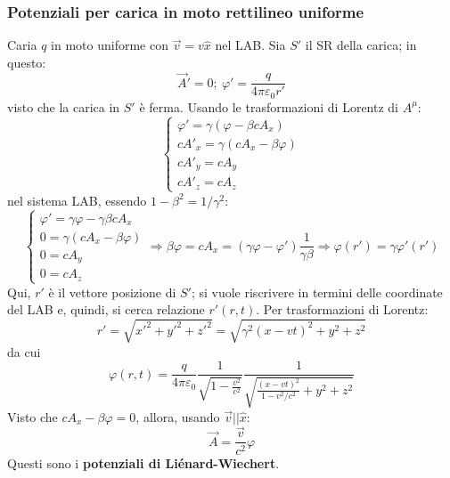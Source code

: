 \documentclass[a4paper]{scrartcl}
\numberwithin{equation}{subsection}
\theoremstyle{style1}
\begin{document}
\subsubsection{Potenziali per carica in moto rettilineo uniforme}\label{pcmru}

Caria $q$ in moto uniforme con $\vec{v}=v \hat{x}$ nel LAB. Sia $S'$ il SR della carica; in questo:
\begin{equation}
		\vec{A}' = 0; \ \varphi ' = \frac{q}{4 \pi \varepsilon _0 r'} 
\end{equation}
visto che la carica in $S'$ \`e ferma. Usando le trasformazioni di Lorentz di $A^\mu $:
\begin{equation}
	\begin{cases}
		\varphi ' = \gamma(\varphi  - \beta cA_x)\\
		cA'_x = \gamma(cA_x - \beta \varphi ) \\
		cA'_y = cA_y \\
		cA'_z = cA_z
	\end{cases}
\end{equation}
nel sistema LAB, essendo $1-\beta ^2 = 1 / \gamma^2$:
\begin{equation}
	\begin{cases}
	\varphi ' = \gamma\varphi  - \gamma \beta c A_x \\
	0 = \gamma(cA_x - \beta \varphi )\\
	0 = cA_y \\
	0 = cA_z
\end{cases} \Rightarrow \beta \varphi = cA_x = (\gamma\varphi  - \varphi ') \frac{1}{\gamma\beta }\Rightarrow \varphi(r')  = \gamma\varphi '(r')
\end{equation}
Qui, $r'$ \`e il vettore posizione di $S'$; si vuole riscrivere in termini delle coordinate del LAB e, quindi, si cerca relazione $r'(r,t)$. Per trasformazioni di Lorentz:
\[
r' = \sqrt{x'^2 + y'^2 + z'^2} = \sqrt{\gamma^2 (x-vt) ^2 + y^2 + z^2} 
\] 
da cui
\begin{equation}
	\varphi (r,t) = \frac{q}{4\pi \varepsilon _0} \frac{1}{\sqrt{1- \frac{v^2}{c^2}} } \frac{1}{\sqrt{\frac{(x-vt)^2}{1-v^2 / c^2} + y^2 + z^2} }
\end{equation}
Visto che $cA_x - \beta \varphi  = 0$, allora, usando $\vec{v} | | \hat{x}$:
\begin{equation}
	\vec{A}= \frac{\vec{v}}{c^2} \varphi 
\end{equation}
Questi sono i \textbf{potenziali di Li\'enard-Wiechert}.
\end{document}
